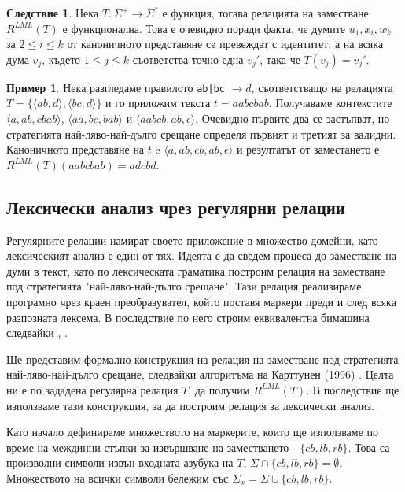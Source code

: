 \documentclass[12pt, oneside]{article}
\theoremstyle{definition}
\newtheorem{example}{Пример}[section]
\newtheorem{corollary}{Следствие}[section]
\begin{document}
\begin{corollary}
	Нека \( T: \Sigma^+ \to \Sigma^* \) е функция, тогава релацията на заместване \( R^{LML}(T) \) е функционална. Това е очевидно поради факта, че думите \(u_1, x_i, w_k \) за \( 2 \le i \le k \) от каноничното представяне се превеждат с идентитет, а на всяка дума \( v_j \), където \( 1 \le j \le k \) съответства точно една \( v_j' \), така че \( T(v_j) = v_j' \).
\end{corollary}

\begin{example}
	Нека разгледаме правилото \verb/ab|bc/ \( \to d \), съответстващо на релацията \(T = \{ \langle ab,d \rangle, \langle bc, d \rangle \} \) и го приложим текста \( t = aabcbab \). Получаваме контекстите \( \langle a, ab, cbab \rangle \), \( \langle aa, bc, bab \rangle \) и \( \langle aabcb, ab, \epsilon \rangle \). Очевидно първите два се застъпват, но стратегията най-ляво-най-дълго срещане определя първият и третият за валидни. Каноничното представяне на \(t \) e \( \langle a, ab, cb, ab, \epsilon  \rangle \) и резултатът от заместането е \( R^{LML}(T)(aabcbab) = adcbd \).
\end{example}

\pagebreak
\subsection{Лексически анализ чрез регулярни релации}
\label{sec:LexARegRel}
Регулярните релации намират своето приложение в множество домейни, като лексическият анализ е един от тях. Идеята е да сведем процеса до заместване на думи в текст, като по лексическата граматика построим релация на заместване под стратегията "най-ляво-най-дълго срещане". Тази релация реализираме програмно чрез краен преобразувател, който поставя маркери преди и след всяка разпозната лексема. В последствие по него строим еквивалентна бимашина следвайки \cite{GerdjikovEtAl:2017}, \cite{Mihov:2018-2}.

Ще представим формално конструкция на релация на заместване под стратегията най-ляво-най-дълго срещане, следвайки алгоритъма на Карттунен (1996) \cite{Karttunen:96}. Целта ни е по зададена регулярна релация \(T\), да получим \( R^{LML}(T) \). В последствие ще използваме тази конструкция, за да построим релация за лексически анализ.

Като начало дефинираме множеството на маркерите, които ще използваме по време на междинни стъпки за извършване на заместването - \( \{ cb, lb, rb \} \). Това са произволни символи извън входната азубука на \(T\), \( \Sigma \cap \{ cb, lb, rb \} = \emptyset \). Множеството на всички символи бележим със \( \Sigma_x = \Sigma \cup \{ cb, lb, rb \} \). 
\end{document}
